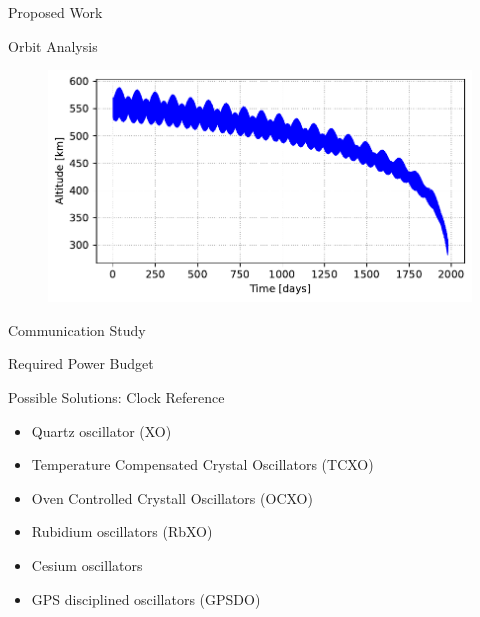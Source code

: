%
%
%
%
%

%
%
%
%
%

\begin{frame}{Proposed Work}


\end{frame}

\begin{frame}{Orbit Analysis}

    \begin{figure}[!ht]
        \begin{center}
            \includegraphics[width=0.8\columnwidth]{figures/lifetime}
        \end{center}
    \end{figure}

\end{frame}

\begin{frame}{Communication Study}

\end{frame}

\begin{frame}{Required Power Budget}

\end{frame}

\begin{frame}{Possible Solutions: Clock Reference}

    \begin{itemize}
        \item Quartz oscillator (XO)
        \item Temperature Compensated Crystal Oscillators (TCXO)
        \item Oven Controlled Crystall Oscillators (OCXO)
        \item Rubidium oscillators (RbXO)
        \item Cesium oscillators
        \item GPS disciplined oscillators (GPSDO)
    \end{itemize}

\end{frame}

